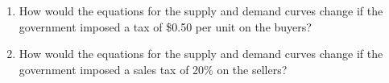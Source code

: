 \begin{enumerate}
\begin{enumerate}
    \item How would the equations for the supply and demand curves change if the government imposed a tax of \$0.50 per unit on the buyers?


    \item How would the equations for the supply and demand curves change if the government imposed a sales tax of 20\% on the sellers?

    \end{enumerate}




\end{enumerate}

\renewcommand\theenumi{\arabic{chapter}.\arabic{enumi}}

